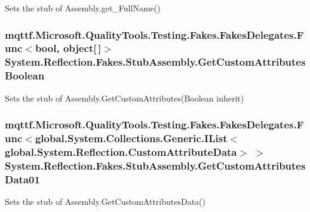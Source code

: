 Sets the stub of Assembly.\-get\-\_\-\-Full\-Name()

\hypertarget{class_system_1_1_reflection_1_1_fakes_1_1_stub_assembly_a5d6230862985b66db12f86f2b48134f9}{
\subsubsection[{Get\-Custom\-Attributes\-Boolean}]{\setlength{\rightskip}{0pt plus 5cm}mqttf.\-Microsoft.\-Quality\-Tools.\-Testing.\-Fakes.\-Fakes\-Delegates.\-Func$<$bool, object\mbox{[}$\,$\mbox{]}$>$ System.\-Reflection.\-Fakes.\-Stub\-Assembly.\-Get\-Custom\-Attributes\-Boolean}}\label{class_system_1_1_reflection_1_1_fakes_1_1_stub_assembly_a5d6230862985b66db12f86f2b48134f9}


Sets the stub of Assembly.\-Get\-Custom\-Attributes(\-Boolean inherit)

\hypertarget{class_system_1_1_reflection_1_1_fakes_1_1_stub_assembly_aba40b108fd129dff2baff9f81d965508}{
\subsubsection[{Get\-Custom\-Attributes\-Data01}]{\setlength{\rightskip}{0pt plus 5cm}mqttf.\-Microsoft.\-Quality\-Tools.\-Testing.\-Fakes.\-Fakes\-Delegates.\-Func$<$global.\-System.\-Collections.\-Generic.\-I\-List$<$global.\-System.\-Reflection.\-Custom\-Attribute\-Data$>$ $>$ System.\-Reflection.\-Fakes.\-Stub\-Assembly.\-Get\-Custom\-Attributes\-Data01}}\label{class_system_1_1_reflection_1_1_fakes_1_1_stub_assembly_aba40b108fd129dff2baff9f81d965508}


Sets the stub of Assembly.\-Get\-Custom\-Attributes\-Data()

